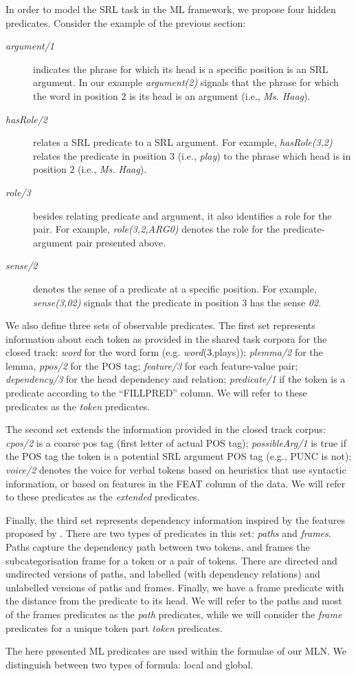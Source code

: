 
In order to model the SRL task in the ML framework, we propose four hidden 
predicates. Consider the example of the previous section:
\begin{description}
    \item [\emph{argument/1}] indicates the phrase for which its head is a 
        specific position is an SRL argument. In our example     
        \emph{argument(2)} signals that the phrase for which the word in 
        position $2$ is its head is an argument (i.e., \emph{Ms. Haag}).
    \item [\emph{hasRole/2}] relates a SRL predicate to a SRL argument. For example, \emph{hasRole(3,2)} relates the
        predicate in position $3$ (i.e., \emph{play}) to the phrase which head 
        is in position $2$ (i.e., \emph{Ms. Haag}).
    \item [\emph{role/3}] besides relating predicate and argument, it also
        identifies a role for the pair. For example,
        \emph{role(3,2,ARG0)} denotes the role for the predicate-argument pair 
        presented above.
    \item [\emph{sense/2}] denotes the sense of a predicate at a
        specific position. For example, \emph{sense(3,02)}
        signals that the predicate in position $3$ has the sense \emph{02}.
\end{description}

We also define three sets of observable predicates. The first set represents information about each token as provided in the shared task corpora for the closed track:  \emph{word} for the word form (e.g. \emph{word}(3,plays)); \emph{plemma/2} for the 
lemma, \emph{ppos/2} for the POS tag; \emph{feature/3} for each feature-value 
pair; \emph{dependency/3} for the head dependency and relation; 
\emph{predicate/1} if the token is a predicate according to the ``FILLPRED'' column. We will refer to these 
predicates as the \emph{token} predicates. 

The second set extends the information provided in the closed track corpus: 
\emph{cpos/2} is a coarse pos tag (first letter of actual POS tag); \emph{possibleArg/1} is true if the POS tag the token is a potential SRL argument  POS tag (e.g., PUNC is not); \emph{voice/2} denotes the voice for verbal tokens based on heuristics that use
syntactic information, or based on features in the FEAT column of the data. We will 
refer to these predicates as the \emph{extended} predicates.

Finally, the third set represents dependency information inspired by the features proposed by \citet{xue04calibrating}. There are two types of 
predicates in this set: \emph{paths} and \emph{frames}.  Paths capture the 
dependency path between two tokens, and frames the subcategorisation frame for a 
token or a pair of tokens. There are directed and 
undirected versions of paths, and labelled  (with dependency relations) and unlabelled versions of paths and frames. Finally, we have a frame predicate with the distance from the 
predicate to its head.  We will refer to the paths and most of the frames 
predicates as the \emph{path} predicates, while we will consider the 
\emph{frame} predicates for a unique token part \emph{token} predicates.

The here presented ML predicates are used within the formulae of our MLN.  We 
distinguish between two types of formula: local and global. 
